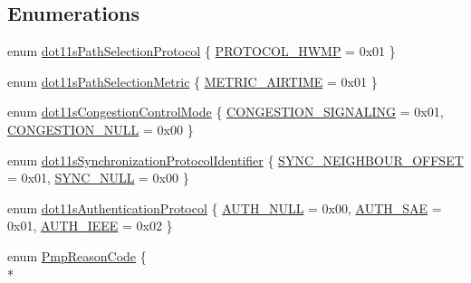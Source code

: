 \subsection*{Enumerations}
\begin{DoxyCompactItemize}
\item 
enum \hyperlink{namespacens3_1_1dot11s_a0d1bf7753c746323a05091844fc055f9}{dot11s\+Path\+Selection\+Protocol} \{ \hyperlink{namespacens3_1_1dot11s_a0d1bf7753c746323a05091844fc055f9a92d76049fec36f0e9ada1a069f1ada9c}{P\+R\+O\+T\+O\+C\+O\+L\+\_\+\+H\+W\+MP} = 0x01
 \}
\item 
enum \hyperlink{namespacens3_1_1dot11s_add870a70d1c8eef99d450ca9e0c51323}{dot11s\+Path\+Selection\+Metric} \{ \hyperlink{namespacens3_1_1dot11s_add870a70d1c8eef99d450ca9e0c51323a9c9cbe8f5b372ed53e43f6792eec984c}{M\+E\+T\+R\+I\+C\+\_\+\+A\+I\+R\+T\+I\+ME} = 0x01
 \}
\item 
enum \hyperlink{namespacens3_1_1dot11s_ad20738249c71cb28b1ef0acad0ceca0a}{dot11s\+Congestion\+Control\+Mode} \{ \hyperlink{namespacens3_1_1dot11s_ad20738249c71cb28b1ef0acad0ceca0aa43e53555a9e432de4cc097d6276632fb}{C\+O\+N\+G\+E\+S\+T\+I\+O\+N\+\_\+\+S\+I\+G\+N\+A\+L\+I\+NG} = 0x01, 
\hyperlink{namespacens3_1_1dot11s_ad20738249c71cb28b1ef0acad0ceca0aac18d5e374127a9664e6a899493a33bd3}{C\+O\+N\+G\+E\+S\+T\+I\+O\+N\+\_\+\+N\+U\+LL} = 0x00
 \}
\item 
enum \hyperlink{namespacens3_1_1dot11s_a31fab993af76c062ff93945bdcb3f599}{dot11s\+Synchronization\+Protocol\+Identifier} \{ \hyperlink{namespacens3_1_1dot11s_a31fab993af76c062ff93945bdcb3f599a5994898e23063f204fcc6165e990bec5}{S\+Y\+N\+C\+\_\+\+N\+E\+I\+G\+H\+B\+O\+U\+R\+\_\+\+O\+F\+F\+S\+ET} = 0x01, 
\hyperlink{namespacens3_1_1dot11s_a31fab993af76c062ff93945bdcb3f599a76aa762b344c94aa7877ce5c2a7b53ef}{S\+Y\+N\+C\+\_\+\+N\+U\+LL} = 0x00
 \}
\item 
enum \hyperlink{namespacens3_1_1dot11s_abdbcad7f88fa5bc91accac0865e18f25}{dot11s\+Authentication\+Protocol} \{ \hyperlink{namespacens3_1_1dot11s_abdbcad7f88fa5bc91accac0865e18f25a091970dc1b34507565a41a561f499c77}{A\+U\+T\+H\+\_\+\+N\+U\+LL} = 0x00, 
\hyperlink{namespacens3_1_1dot11s_abdbcad7f88fa5bc91accac0865e18f25ace73fb82a908e67b6e663feeb5c2eb49}{A\+U\+T\+H\+\_\+\+S\+AE} = 0x01, 
\hyperlink{namespacens3_1_1dot11s_abdbcad7f88fa5bc91accac0865e18f25a4887dc6a1e26a2bc326da1c57b36c928}{A\+U\+T\+H\+\_\+\+I\+E\+EE} = 0x02
 \}
\item 
enum \hyperlink{group__dot11s_ga1132ec5975c87960ceb86ea54481aba6}{Pmp\+Reason\+Code} \{ \\*

\end{DoxyCompactItemize}
